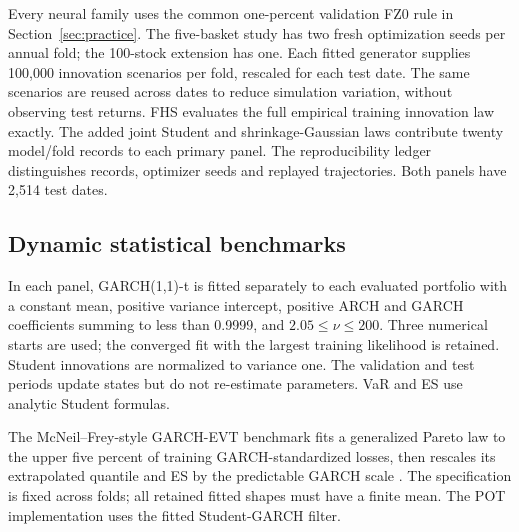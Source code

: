 \documentclass[11pt]{article}
\theoremstyle{definition}\newtheorem{definition}[theorem]{Definition}
\theoremstyle{remark}\newtheorem{remark}[theorem]{Remark}
\begin{document}
Every neural family uses the common one-percent validation FZ0 rule in Section~\ref{sec:practice}. The five-basket study has two fresh optimization seeds per annual fold; the 100-stock extension has one. Each fitted generator supplies 100,000 innovation scenarios per fold, rescaled for each test date. The same scenarios are reused across dates to reduce simulation variation, without observing test returns. FHS evaluates the full empirical training innovation law exactly. The added joint Student and shrinkage-Gaussian laws contribute twenty model/fold records to each primary panel. The reproducibility ledger distinguishes records, optimizer seeds and replayed trajectories. Both panels have 2,514 test dates. 

\subsection{Dynamic statistical benchmarks}
In each panel, GARCH(1,1)-t is fitted separately to each evaluated portfolio with a constant mean, positive variance intercept, positive ARCH and GARCH coefficients summing to less than 0.9999, and $2.05\le\nu\le200$. Three numerical starts are used; the converged fit with the largest training likelihood is retained. Student innovations are normalized to variance one. The validation and test periods update states but do not re-estimate parameters. VaR and ES use analytic Student formulas.

The McNeil--Frey-style GARCH-EVT benchmark fits a generalized Pareto law to the upper five percent of training GARCH-standardized losses, then rescales its extrapolated quantile and ES by the predictable GARCH scale \citep{mcneil2000evt}. The specification is fixed across folds; all retained fitted shapes must have a finite mean. The POT implementation uses the fitted Student-GARCH filter.
\end{document}
